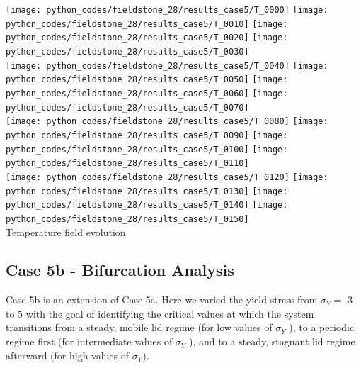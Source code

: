 \newpage
\noindent
\begin{center}
\texttt{[image: python\_codes/fieldstone\_28/results\_case5/T\_0000]}
\texttt{[image: python\_codes/fieldstone\_28/results\_case5/T\_0010]}
\texttt{[image: python\_codes/fieldstone\_28/results\_case5/T\_0020]}
\texttt{[image: python\_codes/fieldstone\_28/results\_case5/T\_0030]}\\
\texttt{[image: python\_codes/fieldstone\_28/results\_case5/T\_0040]}
\texttt{[image: python\_codes/fieldstone\_28/results\_case5/T\_0050]}
\texttt{[image: python\_codes/fieldstone\_28/results\_case5/T\_0060]}
\texttt{[image: python\_codes/fieldstone\_28/results\_case5/T\_0070]}\\
\texttt{[image: python\_codes/fieldstone\_28/results\_case5/T\_0080]}
\texttt{[image: python\_codes/fieldstone\_28/results\_case5/T\_0090]}
\texttt{[image: python\_codes/fieldstone\_28/results\_case5/T\_0100]}
\texttt{[image: python\_codes/fieldstone\_28/results\_case5/T\_0110]}\\
\texttt{[image: python\_codes/fieldstone\_28/results\_case5/T\_0120]}
\texttt{[image: python\_codes/fieldstone\_28/results\_case5/T\_0130]}
\texttt{[image: python\_codes/fieldstone\_28/results\_case5/T\_0140]}
\texttt{[image: python\_codes/fieldstone\_28/results\_case5/T\_0150]}\\
{\captionfont Temperature field evolution}
\end{center}

\subsection*{Case 5b - Bifurcation Analysis}

Case 5b is an extension of Case 5a. Here we varied the yield stress from $\sigma_Y=$ 3 to 5 with the goal of identifying 
the critical values at which the system transitions from a steady, mobile lid regime (for low values of $\sigma_Y$ ),
to a periodic regime first (for intermediate values of $\sigma_Y$ ), and to a steady, stagnant lid regime afterward (for
high values of $\sigma_Y$).


